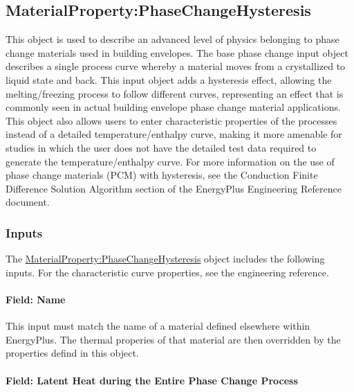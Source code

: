 \subsection{MaterialProperty:PhaseChangeHysteresis}\label{materialpropertyphasechangehysteresis}

This object is used to describe an advanced level of physics belonging to phase change materials used in building envelopes.
The base phase change input object describes a single process curve whereby a material moves from a crystallized to liquid state and back.
This input object adds a hysteresis effect, allowing the melting/freezing process to follow different curves, representing an effect that is commonly seen in actual building envelope phase change material applications.
This object also allows users to enter characteristic properties of the processes instead of a detailed temperature/enthalpy curve, making it more amenable for studies in which the user does not have the detailed test data required to generate the temperature/enthalpy curve.  For more information on the use of phase change materials (PCM) with hysteresis, see the Conduction Finite Difference Solution Algorithm section of the EnergyPlus Engineering Reference document.

\subsubsection{Inputs}\label{materialpropertyphasechangehysteresis-inputs}

The \hyperref[materialpropertyphasechangehysteresis]{MaterialProperty:PhaseChangeHysteresis} object includes the following inputs.  For the characteristic curve properties, see the engineering reference.

\paragraph{Field: Name}\label{materialpropertyphasechangehysteresis-name}

This input must match the name of a material defined elsewhere within EnergyPlus.  The thermal properies of that material are then overridden by the properties defind in this object.

\paragraph{Field: Latent Heat during the Entire Phase Change Process}\label{materialpropertyphasechangehysteresis-inputs-latent-heat-during-the-entire-phase-change-process}

